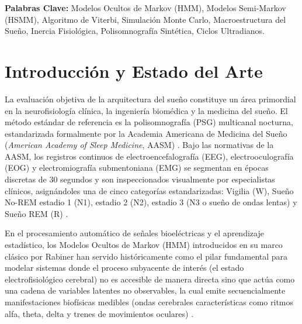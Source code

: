 \documentclass[11pt,a4paper]{article}
\begin{document}
\noindent\textbf{Palabras Clave:} Modelos Ocultos de Markov (HMM), Modelos Semi-Markov (HSMM), Algoritmo de Viterbi, Simulación Monte Carlo, Macroestructura del Sueño, Inercia Fisiológica, Polisomnografía Sintética, Ciclos Ultradianos.

\vspace{0.4cm}

\section{Introducción y Estado del Arte}

La evaluación objetiva de la arquitectura del sueño constituye un área primordial en la neurofisiología clínica, la ingeniería biomédica y la medicina del sueño. El método estándar de referencia es la polisomnografía (PSG) multicanal nocturna, estandarizada formalmente por la Academia Americana de Medicina del Sueño (\textit{American Academy of Sleep Medicine}, AASM) \cite{iberaasm2007, aasm2020}. Bajo las normativas de la AASM, los registros continuos de electroencefalografía (EEG), electrooculografía (EOG) y electromiografía submentoniana (EMG) se segmentan en épocas discretas de 30 segundos y son inspeccionados visualmente por especialistas clínicos, asignándoles una de cinco categorías estandarizadas: Vigilia (W), Sueño No-REM estadio 1 (N1), estadio 2 (N2), estadio 3 (N3 o sueño de ondas lentas) y Sueño REM (R) \cite{carska2011, aasm2020}.

En el procesamiento automático de señales bioeléctricas y el aprendizaje estadístico, los Modelos Ocultos de Markov (HMM) introducidos en su marco clásico por Rabiner \cite{rabiner1989} han servido históricamente como el pilar fundamental para modelar sistemas donde el proceso subyacente de interés (el estado electrofisiológico cerebral) no es accesible de manera directa sino que actúa como una cadena de variables latentes no observables, la cual emite secuencialmente manifestaciones biofísicas medibles (ondas cerebrales características como ritmos alfa, theta, delta y trenes de movimientos oculares) \cite{rabiner1989, fiorillo2021}.
\end{document}
